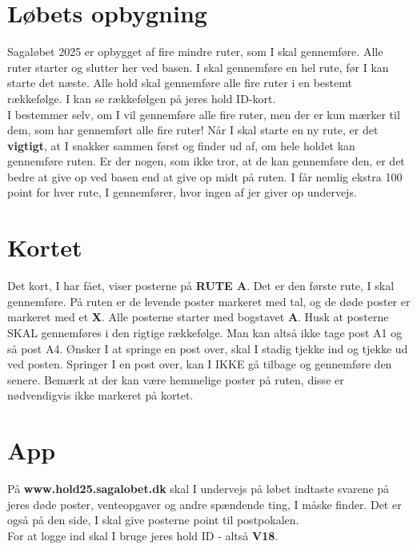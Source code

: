 \section{Løbets opbygning}
Sagaløbet 2025 er opbygget af fire mindre ruter, som I skal gennemføre. Alle ruter starter og slutter her ved basen. I skal gennemføre en hel rute, før I kan starte det næste. Alle hold skal gennemføre alle fire ruter i en bestemt rækkefølge. I kan se rækkefølgen på jeres hold ID-kort.\\\newline
I bestemmer selv, om I vil gennemføre alle fire ruter, men der er kun mærker til dem, som har gennemført alle fire ruter! Når I skal starte en ny rute, er det \textbf{vigtigt}, at I snakker sammen først og finder ud af, om hele holdet kan gennemføre ruten. Er der nogen, som ikke tror, at de kan gennemføre den, er det bedre at give op ved basen end at give op midt på ruten. I får nemlig ekstra 100 point for hver rute, I gennemfører, hvor ingen af jer giver op undervejs.\\
\section{Kortet}
Det kort, I har fået, viser posterne på \textbf{RUTE A}. Det er den første rute, I skal gennemføre. På ruten er de levende poster markeret med tal, og de døde poster er markeret med et \textbf{X}. Alle posterne starter med bogstavet \textbf{A}. Husk at posterne SKAL gennemføres i den rigtige rækkefølge. Man kan altså ikke tage post A1 og så post A4. Ønsker I at springe en post over, skal I stadig tjekke ind og tjekke ud ved posten. Springer I en post over, kan I IKKE gå tilbage og gennemføre den senere. Bemærk at der kan være hemmelige poster på ruten, disse er nødvendigvis ikke markeret på kortet.
\section{App}
På \textbf{www.hold25.sagalobet.dk} skal I undervejs på løbet indtaste svarene på jeres døde poster, venteopgaver og andre spændende ting, I måske finder. Det er også på den side, I skal give posterne point til postpokalen.\\
For at logge ind skal I bruge jeres hold ID - altså \textbf{V18}.
\newpage
